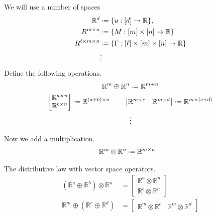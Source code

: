 We will use a number of spaces
\begin{align*}
    \mathbb{R}^d & \defeq \{u:[d]\to \mathbb{R}\},\\
    R^{m\times n} &\defeq \{M:[m]\times [n]\to \mathbb{R}\}\\
    R^{\ell\times m\times n} &\defeq \{\Gamma:[\ell]\times [m]\times [n]\to \mathbb{R}\}\\
    & \vdots
\end{align*}
Define the following operations.
\begin{gather*}
    \mathbb{R}^m\oplus \mathbb{R}^n  \defeq \mathbb{R}^{m+n}\\
    \begin{bmatrix} \mathbb{R}^{a\times n} \\ \mathbb{R}^{b\times n} \end{bmatrix} \defeq \mathbb{R}^{(a+b)\times n}
    \qquad
    \begin{bmatrix}
    \mathbb{R}^{m\times c} &
    \mathbb{R}^{m\times d}
    \end{bmatrix}  \defeq \mathbb{R}^{m\times (c+d)}\\
     \vdots
\end{gather*}



Now we add a multiplication.
\begin{align*}
    \mathbb{R}^m \otimes \mathbb{R}^n & \defeq \mathbb{R}^{m\times n}
\end{align*}

\begin{example}
    The distributive law with vector space operators.
    \begin{align*}
    (\mathbb{R}^a \oplus \mathbb{R}^b)\otimes \mathbb{R}^n 
        &  = \begin{bmatrix}\mathbb{R}^{a}\otimes \mathbb{R}^n  \\ \mathbb{R}^b\otimes \mathbb{R}^n\end{bmatrix}\\
    \mathbb{R}^m\oplus ( \mathbb{R}^c \oplus \mathbb{R}^d )
        &  = \begin{bmatrix} 
            \mathbb{R}^{m}\otimes \mathbb{R}^c &
            \mathbb{R}^m\otimes \mathbb{R}^d
        \end{bmatrix}
    \end{align*}
\end{example}

